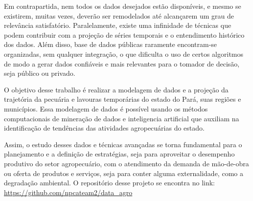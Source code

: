 Em contrapartida, nem todos os dados desejados estão disponíveis, e mesmo se existirem, muitas vezes, deverão ser remodelados até alcançarem um grau de relevância satisfatório. Paralelamente, existe uma infinidade de técnicas que podem contribuir com a projeção de séries temporais e o entendimento histórico dos dados. Além disso, base de dados públicas raramente encontram-se organizadas, sem qualquer integração, o que dificulta o uso de certos algoritmos de modo a gerar dados confiáveis e mais relevantes para o tomador de decisão, seja público ou privado.

O objetivo desse trabalho é realizar a modelagem de dados e a projeção da trajetória da pecuária e lavouras temporárias do estado do Pará, suas regiões e municípios. Essa modelagem de dados é possível usando os métodos computacionais de mineração de dados e inteligencia artificial que auxiliam na identificação de tendências das atividades agropecuárias do estado. 

Assim, o estudo desses dados e técnicas avançadas se torna fundamental para o planejamento e a definição de estratégias, seja para aproveitar o desempenho produtivo do setor agropecuário, com o atendimento da demanda de mão-de-obra ou oferta de produtos e serviços, seja para conter alguma externalidade, como a degradação ambiental. O repositório desse projeto se encontra no link: \url{https://github.com/npcateam2/data_agro}